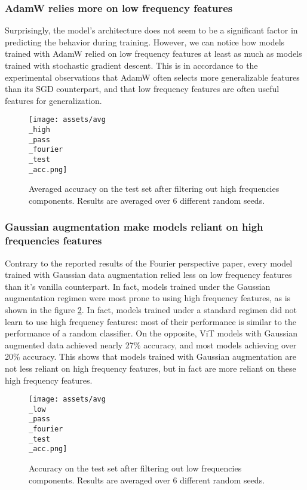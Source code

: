 \documentclass{article} \author{Simon Théorêt}
\begin{document}
\subsubsection*{AdamW relies more on low frequency features}
Surprisingly, the model's architecture does not seem to be a
significant factor in predicting the behavior during training.
However, we can notice how models trained with AdamW relied on low
frequency features at least as much as models trained with stochastic
gradient descent. This is in accordance to the experimental
observations that AdamW often selects more generalizable features than
its SGD counterpart, and that low frequency features are often useful
features for generalization.

\begin{figure}[h]
  \centering
  \texttt{[image: assets/avg\\\_high\\\_pass\\\_fourier\\\_test\\\_acc.png]}
  \caption{Averaged accuracy on the test set after filtering out high
    frequencies components. Results are averaged over 6 different
    random seeds.}
	\label{fig:higherror}
\end{figure}

\subsubsection*{Gaussian augmentation make models reliant on high
  frequencies features }
Contrary to the reported results of the Fourier perspective paper,
every model trained with Gaussian data augmentation relied less on low
frequency features than it's vanilla counterpart. In fact, models
trained under the Gaussian augmentation regimen were most prone to
using high frequency features, as is shown in the figure
\ref{fig:lowerror}. In fact, models trained under a standard regimen
did not learn to use high frequency features: most of their
performance is similar to the performance of a random classifier. On
the opposite, ViT models with Gaussian augmented data achieved nearly
27\% accuracy, and most models achieving over 20\% accuracy. This
shows that models trained with Gaussian augmentation are not less
reliant on high frequency features, but in fact are more reliant on
these high frequency features.

\begin{figure}[h!]
  \centering
  \texttt{[image: assets/avg\\\_low\\\_pass\\\_fourier\\\_test\\\_acc.png]}
  \caption{Accuracy on the test set after filtering out low
    frequencies components. Results are averaged over 6 different
    random seeds.}
	\label{fig:lowerror}
\end{figure}
\end{document}
